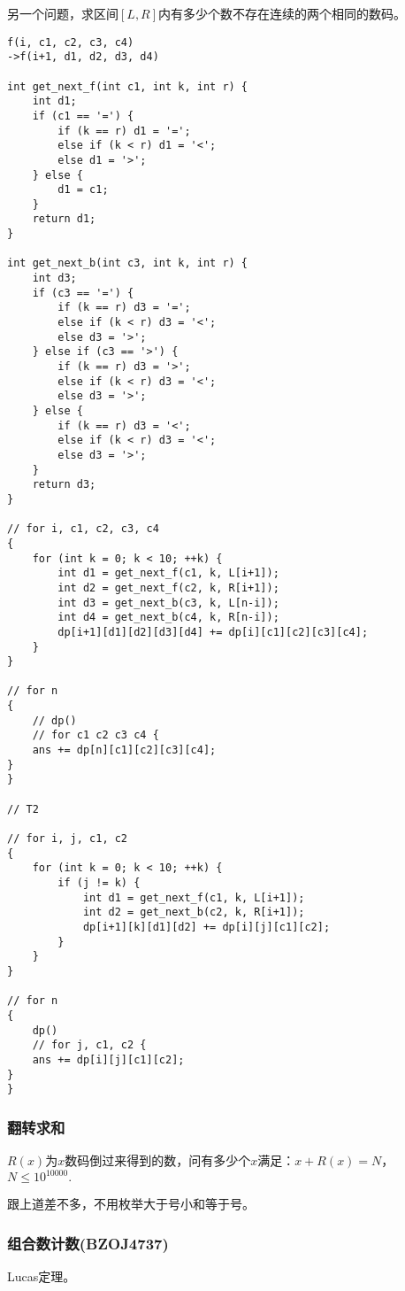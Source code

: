 另一个问题，求区间$[L,R]$内有多少个数不存在连续的两个相同的数码。
\begin{verbatim}
f(i, c1, c2, c3, c4)
->f(i+1, d1, d2, d3, d4)

int get_next_f(int c1, int k, int r) {
    int d1;
    if (c1 == '=') {
        if (k == r) d1 = '=';
        else if (k < r) d1 = '<';
        else d1 = '>';
    } else {
        d1 = c1;
    }
    return d1;
}

int get_next_b(int c3, int k, int r) {
    int d3;
    if (c3 == '=') {
        if (k == r) d3 = '=';
        else if (k < r) d3 = '<';
        else d3 = '>';
    } else if (c3 == '>') {
        if (k == r) d3 = '>';
        else if (k < r) d3 = '<';
        else d3 = '>';
    } else {
        if (k == r) d3 = '<';
        else if (k < r) d3 = '<';
        else d3 = '>';
    }
    return d3;
}

// for i, c1, c2, c3, c4
{
    for (int k = 0; k < 10; ++k) {
        int d1 = get_next_f(c1, k, L[i+1]);
        int d2 = get_next_f(c2, k, R[i+1]);
        int d3 = get_next_b(c3, k, L[n-i]);
        int d4 = get_next_b(c4, k, R[n-i]);
        dp[i+1][d1][d2][d3][d4] += dp[i][c1][c2][c3][c4];
    }
}

// for n
{
    // dp()
    // for c1 c2 c3 c4 {
    ans += dp[n][c1][c2][c3][c4];
}
}

// T2

// for i, j, c1, c2
{
    for (int k = 0; k < 10; ++k) {
        if (j != k) {
            int d1 = get_next_f(c1, k, L[i+1]);
            int d2 = get_next_b(c2, k, R[i+1]);
            dp[i+1][k][d1][d2] += dp[i][j][c1][c2];
        }
    }
}

// for n
{
    dp()
    // for j, c1, c2 {
    ans += dp[i][j][c1][c2];
}
}
\end{verbatim}
\subsubsection{翻转求和}
$R(x)$为$x$数码倒过来得到的数，问有多少个$x$满足：$x+R(x)=N$，$N\le 10^{10000}.$

跟上道差不多，不用枚举大于号小和等于号。
\subsubsection{组合数计数(BZOJ4737)}
Lucas定理。
